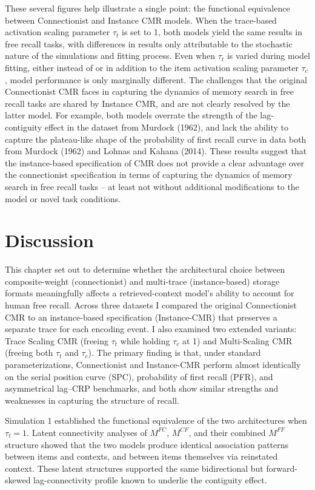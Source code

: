 \documentclass[
  letterpaper,
  11pt,
  english,
  singlespacing,
  headsepline]{MastersDoctoralThesis}
\begin{document}
These several figures help illustrate a single point: the functional
equivalence between Connectionist and Instance CMR models. When the
trace-based activation scaling parameter \(\tau_{t}\) is set to 1, both
models yield the same results in free recall tasks, with differences in
results only attributable to the stochastic nature of the simulations
and fitting process. Even when \(\tau_{t}\) is varied during model
fitting, either instead of or in addition to the item activation scaling
parameter \(\tau_{c}\), model performance is only marginally different.
The challenges that the original Connectionist CMR faces in capturing
the dynamics of memory search in free recall tasks are shared by
Instance CMR, and are not clearly resolved by the latter model. For
example, both models overrate the strength of the lag-contiguity effect
in the dataset from Murdock (1962), and lack the ability to capture the
plateau-like shape of the probability of first recall curve in data both
from Murdock (1962) and Lohnas and Kahana (2014). These results suggest
that the instance-based specification of CMR does not provide a clear
advantage over the connectionist specification in terms of capturing the
dynamics of memory search in free recall tasks -- at least not without
additional modifications to the model or novel task conditions.

\section{Discussion}\label{discussion}

This chapter set out to determine whether the architectural choice
between composite-weight (connectionist) and multi-trace
(instance-based) storage formats meaningfully affects a
retrieved-context model's ability to account for human free recall.
Across three datasets I compared the original Connectionist CMR to an
instance-based specification (Instance-CMR) that preserves a separate
trace for each encoding event. I also examined two extended variants:
Trace Scaling CMR (freeing \(\tau_t\) while holding \(\tau_c\) at 1) and
Multi-Scaling CMR (freeing both \(\tau_t\) and \(\tau_c\)). The primary
finding is that, under standard parameterizations, Connectionist and
Instance-CMR perform almost identically on the serial position curve
(SPC), probability of first recall (PFR), and asymmetrical lag--CRP
benchmarks, and both show similar strengths and weaknesses in capturing
the structure of recall.

Simulation 1 established the functional equivalence of the two
architectures when \(\tau_t = 1\). Latent connectivity analyses of
\(M^{FC}\), \(M^{CF}\), and their combined \(M^{FF}\) structure showed
that the two models produce identical association patterns between items
and contexts, and between items themselves via reinstated context. These
latent structures supported the same bidirectional but forward-skewed
lag-connectivity profile known to underlie the contiguity effect.
\end{document}
